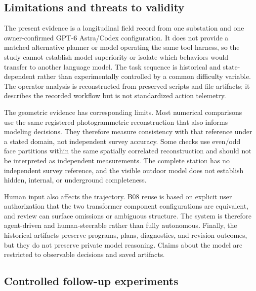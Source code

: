 \documentclass[10pt,a4paper]{article}
\begin{document}
\hypertarget{limitations-and-threats-to-validity}{%
\subsection{Limitations and threats to
validity}\label{limitations-and-threats-to-validity}}

The present evidence is a longitudinal field record from one substation
and one owner-confirmed GPT-6 Astra/Codex configuration. It does not
provide a matched alternative planner or model operating the same tool
harness, so the study cannot establish model superiority or isolate
which behaviors would transfer to another language model. The task
sequence is historical and state-dependent rather than experimentally
controlled by a common difficulty variable. The operator analysis is
reconstructed from preserved scripts and file artifacts; it describes
the recorded workflow but is not standardized action telemetry.

The geometric evidence has corresponding limits. Most numerical
comparisons use the same registered photogrammetric reconstruction that
also informs modeling decisions. They therefore measure consistency with
that reference under a stated domain, not independent survey accuracy.
Some checks use even/odd face partitions within the same spatially
correlated reconstruction and should not be interpreted as independent
measurements. The complete station has no independent survey reference,
and the visible outdoor model does not establish hidden, internal, or
underground completeness.

Human input also affects the trajectory. B08 reuse is based on explicit
user authorization that the two transformer component configurations are
equivalent, and review can surface omissions or ambiguous structure. The
system is therefore agent-driven and human-steerable rather than fully
autonomous. Finally, the historical artifacts preserve programs, plans,
diagnostics, and revision outcomes, but they do not preserve private
model reasoning. Claims about the model are restricted to observable
decisions and saved artifacts.

\hypertarget{controlled-follow-up-experiments}{%
\subsection{Controlled follow-up
experiments}\label{controlled-follow-up-experiments}}
\end{document}
